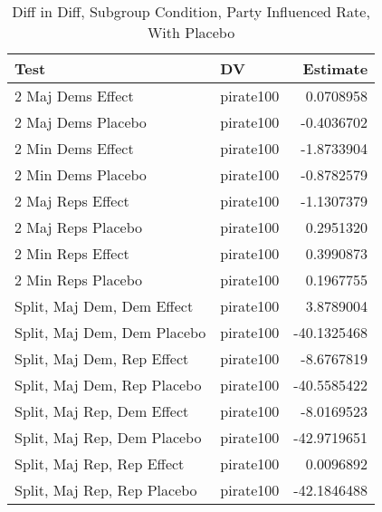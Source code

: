 \documentclass[12pt]{article}
\begin{document}
\begin{table}[ht]
	\centering
	\caption{Diff in Diff, Subgroup Condition, Party Influenced Rate, With Placebo}
	\begin{tabular}{llr}
		\hline
		Test & DV & Estimate \\ 
		\hline
		2 Maj Dems Effect & pirate100 & 0.0708958 \\ 
		2 Maj Dems Placebo & pirate100 & -0.4036702 \\ 
		\hline
		2 Min Dems Effect & pirate100 & -1.8733904 \\ 
		2 Min Dems Placebo & pirate100 & -0.8782579 \\ 
		\hline
		2 Maj Reps Effect & pirate100 & -1.1307379 \\ 
		2 Maj Reps Placebo & pirate100 & 0.2951320 \\ 
		\hline
		2 Min Reps Effect & pirate100 & 0.3990873 \\ 
		2 Min Reps Placebo & pirate100 & 0.1967755 \\ 
		\hline
		Split, Maj Dem, Dem Effect & pirate100 & 3.8789004 \\ 
		Split, Maj Dem, Dem Placebo & pirate100 & -40.1325468 \\ 
		\hline
		Split, Maj Dem, Rep Effect & pirate100 & -8.6767819 \\ 
		Split, Maj Dem, Rep Placebo & pirate100 & -40.5585422 \\ 
		\hline
		Split, Maj Rep, Dem Effect & pirate100 & -8.0169523 \\ 
		Split, Maj Rep, Dem Placebo & pirate100 & -42.9719651 \\ 
		\hline
		Split, Maj Rep, Rep Effect & pirate100 & 0.0096892 \\ 
		Split, Maj Rep, Rep Placebo & pirate100 & -42.1846488 \\ 
		\hline
	\end{tabular}
\end{table}
\end{document}
